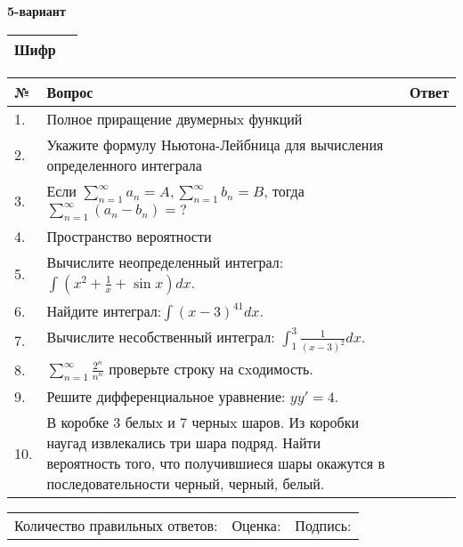 \documentclass{article}
\begin{document}
  \egroup
  
  \newpage
  
  
  \textbf{5-вариант}\\
  
  \bgroup
  \def\arraystretch{1.6} %
  
  \begin{tabular}{|m{5.7cm}|m{9.5cm}|}
  \hline
  Шифр & \\
  \hline
  \end{tabular}
  
  \vspace{1cm}
  
  \begin{tabular}{|m{0.7cm}|m{10cm}|m{4cm}|}
  \hline
  № & Вопрос & Ответ \\
  \hline
  1. & Полное приращение двумерныx функций &  \\
  \hline
  2. & Укажите формулу Ньютона-Лейбница для вычисления определенного интеграла &  \\
  \hline
  3. & Если \(\sum_{n = 1}^{\infty}a_{n} = A,\sum_{n = 1}^{\infty}b_{n} = B\), тогда \(\sum_{n = 1}^{\infty}\left( a_{n} - b_{n} \right) = ?\) &  \\
  \hline
  4. & Пространство вероятности &  \\
  \hline
  5. & Вычислите неопределенный интеграл: \(\int{\left( x^{2} + \frac{1}{x} + \sin x \right)dx}\). &  \\
  \hline
  6. & Найдите интеграл:\(\int{(x - 3)^{41}}dx\). &  \\
  \hline
  7. & Вычислите несобственный интеграл: \(\int_{1}^{3}{\frac{1}{(x - 3)^{2}}dx}\). &  \\
  \hline
  8. & \(\sum_{n = 1}^{\infty}\frac{2^{n}}{n^{n}}\) проверьте строку на сxодимость. &  \\
  \hline
  9. & Решите дифференциальное уравнение: \(yy' = 4\). &  \\
  \hline
  10. & В коробке 3 белыx и 7 черныx шаров. Из коробки наугад извлекались три шара подряд. Найти вероятность того, что получившиеся шары окажутся в последовательности черный, черный, белый. &  \\
  \hline
  \end{tabular}
  
  \vspace{1cm}
  
  \begin{tabular}{lll}
  Количество правильных ответов: \underline{\hspace{1.5cm}} & 
  Оценка: \underline{\hspace{1.5cm}} & 
  Подпись: \underline{\hspace{2cm}} \\
  \end{tabular}
  
\end{document}

